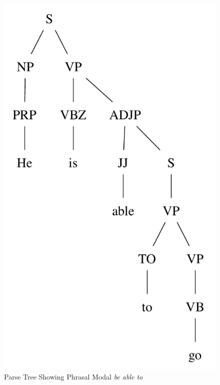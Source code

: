 \documentclass[main.tex]{subfiles}
\begin{document}
\begin{figure}[htbp]
\centering
\includegraphics[scale=0.6]{modal-able.pdf}
\caption{Parse Tree Showing Phrasal Modal \textit{be able to}}
\label{fig:quasimodal-able}
\end{figure}
\end{document}
